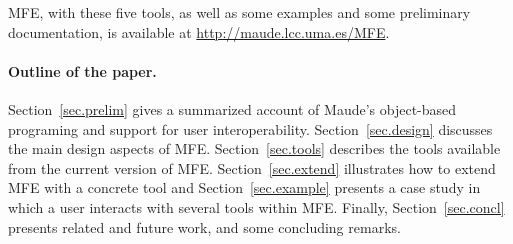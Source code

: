 MFE, with these five tools, as well
as some examples and some preliminary documentation, is available
at \url{http://maude.lcc.uma.es/MFE}.

\paragraph{\bf Outline of the paper.} 
Section~\ref{sec.prelim} gives a summarized account
of Maude's object-based programing and support for user interoperability.
Section~\ref{sec.design} discusses the main design
aspects of MFE. 
Section~\ref{sec.tools} describes the tools available
from the current version of MFE.
Section~\ref{sec.extend} illustrates how to extend MFE with a concrete tool 
and Section~\ref{sec.example} presents
a case study in which a user interacts with several tools 
within MFE.
Finally, Section~\ref{sec.concl} presents related and future work,
and some concluding remarks.
